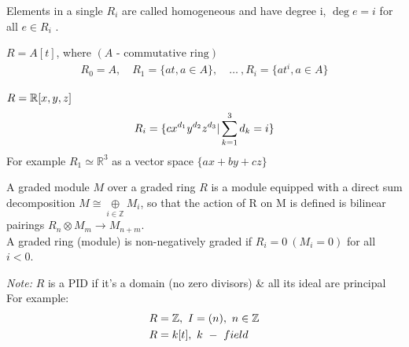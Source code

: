 \documentclass[11pt,a4paper]{report}
\begin{document}
              Elements in a single $R_i$ are called homogeneous and have degree i, $\deg e = i$ for all $e \in R_i$ \cite{Artin_2011}.

              \begin{Ex}
                $ R = A[t]$, where  $(A \textrm{ - commutative ring})$
              \begin{align*}
                R_0 = A, \quad R_1 = \{at, a \in A\}, \quad \dots \ , R_i = \{at^i, a \in A\}
              \end{align*}
              \end{Ex}
              \begin{Ex}
                $R = \mathbb{R}[x,y,z]$
                \[
                R_i = \{cx^{d_{1}}y^{d_{2}}z^{d_{3}} | \sum^3_{k=1}d_k = i\}\\
                \]
              For example $R_1 \simeq \mathbb{R}^3$ as a vector space $\{ax + by + cz\}$\\
              \end{Ex}


               A graded module $M$ over a graded ring $R$ is a module equipped with a direct sum decomposition $M \cong \underset{i \in \mathbb{Z}}{\oplus} M_i$, so that the action of R on M is defined is bilinear pairings $R_n \otimes M_m \rightarrow M_{n+m}$. \\

              A graded ring (module) is non-negatively graded if $R_i = 0 \ (M_i = 0)$ for all $i < 0$.

              \emph{Note:} $R$ is a PID if it's a domain (no zero divisors) \& all its ideal are principal\\

             For example:
              \begin{align*}
                &R = \mathbb{Z}, \ I = (n),\ n \in \mathbb{Z} \\
                &R = k[t],\ k\ -\ field\\
              \end{align*}
\end{document}
